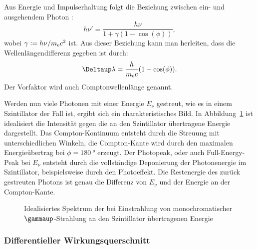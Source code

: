 \documentclass[11pt, ngerman, fleqn, DIV=15, headinclude, BCOR=2cm]{scrreprt}
\begin{document}
Aus Energie und Impulserhaltung folgt die Beziehung zwischen ein- und
ausgehendem Photon \parencite[(2.106)]{Leo/Techniques_Nuclear_Experiments}:
\[
    h\nu' = \frac{h\nu}{1 + \gamma(1 - \cos(\phi))},
\]
wobei $\gamma := h \nu / m_\text e c^2$ ist. Aus dieser Beziehung kann man
herleiten, dass die Wellenlängendifferenz gegeben ist durch:
\[
    \Deltaup \lambda = \frac{h}{m_\text e c} (1 - \cos(\phi)).
\]
Der Vorfaktor wird auch Comptonwellenlänge genannt.

Werden nun viele Photonen mit einer Energie $E_\nu$ gestreut, wie es in einem
Szintillator der Fall ist, ergibt sich ein charakteristisches Bild. In
Abbildung~\ref{fig:Compton} ist idealisiert die Intensität gegen die an den
Szintillator übertragene Energie dargestellt. Das Compton-Kontinuum entsteht
durch die Streuung mit unterschiedlichen Winkeln, die Compton-Kante wird durch
den maximalen Energieübertrag bei $\phi = \SI{180}{\degree}$ erzeugt. Der
Photopeak, oder auch Full-Energy-Peak bei $E_\nu$ entsteht durch die
vollständige Deponierung der Photonenergie im Szintillator, beispielsweise
durch den Photoeffekt. Die Restenergie des zurück gestreuten Photons ist genau
die Differenz von $E_\nu$ und der Energie an der Compton-Kante.

\begin{figure}[htbp]
    \centering
    \caption{%
        Idealisiertes Spektrum der bei Einstrahlung von monochromatischer
        $\gammaup$-Strahlung an den Szintillator übertragenen Energie
    }
    \label{fig:Compton}
\end{figure}

\subsubsection{Differentieller Wirkungsquerschnitt}
\end{document}
